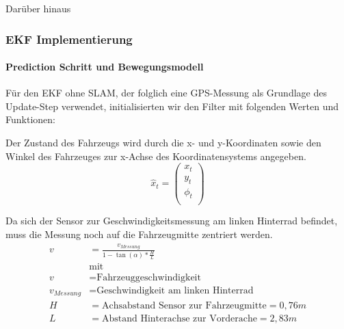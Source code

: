\documentclass[11pt]{article}
\begin{document}
Darüber hinaus

\subsubsection{EKF Implementierung}
\paragraph{Prediction Schritt und Bewegungsmodell}
Für den EKF ohne SLAM, der folglich eine GPS-Messung als Grundlage des Update-Step verwendet, initialisierten wir den Filter mit folgenden Werten und Funktionen:

Der Zustand des Fahrzeugs wird durch die x- und y-Koordinaten sowie den Winkel des Fahrzeuges zur x-Achse des Koordinatensystems angegeben.
\begin{equation}\label{EKF-State-Vector}
	\hat{x}_t = \begin{pmatrix}
		x_t \\
		y_t \\
		\phi_t \\
	  \end{pmatrix}
\end{equation}

Da sich der Sensor zur Geschwindigkeitsmessung am linken Hinterrad befindet, muss die Messung noch auf die Fahrzeugmitte zentriert werden.
\begin{equation}\label{Geschwindikeit}
\begin{split}
	v &= \frac{v_{Messung}}{1-\tan(\alpha)*\frac{H}{L}} \\
	&\text{mit } \\
	v &= \text{Fahrzeuggeschwindigkeit} \\
	v_{Messung} &= \text{Geschwindigkeit am linken Hinterrad} \\
	H &= \text{Achsabstand Sensor zur Fahrzeugmitte} = 0,76m \\
	L &= \text{Abstand Hinterachse zur Vorderache} = 2,83m
\end{split}
\end{equation}
\end{document}
